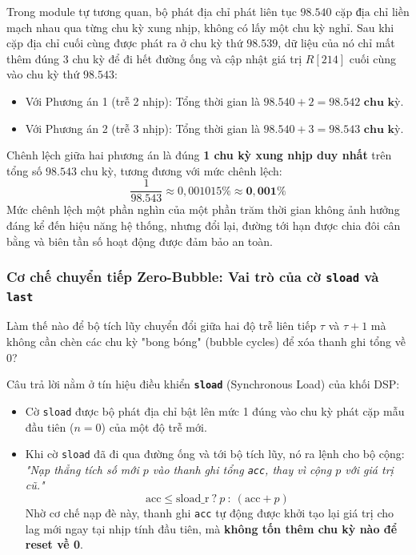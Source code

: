 Trong module tự tương quan, bộ phát địa chỉ phát liên tục $98.540\text{ cặp địa chỉ}$ liền mạch nhau qua từng chu kỳ xung nhịp, không có lấy một chu kỳ nghỉ. Sau khi cặp địa chỉ cuối cùng được phát ra ở chu kỳ thứ $98.539$, dữ liệu của nó chỉ mất thêm đúng 3 chu kỳ để đi hết đường ống và cập nhật giá trị $R[214]$ cuối cùng vào chu kỳ thứ $98.543$:
\begin{itemize}[leftmargin=1.5em, itemsep=2pt]
    \item Với Phương án 1 (trễ 2 nhịp): Tổng thời gian là $98.540 + 2 = \mathbf{98.542\text{ chu kỳ}}$.
    \item Với Phương án 2 (trễ 3 nhịp): Tổng thời gian là $98.540 + 3 = \mathbf{98.543\text{ chu kỳ}}$.
\end{itemize}
Chênh lệch giữa hai phương án là đúng \textbf{1 chu kỳ xung nhịp duy nhất} trên tổng số $98.543\text{ chu kỳ}$, tương đương với mức chênh lệch:
\begin{equation}
\frac{1}{98.543} \approx 0{,}001015\% \approx \mathbf{0{,}001\%}
\end{equation}
Mức chênh lệch một phần nghìn của một phần trăm thời gian không ảnh hưởng đáng kể đến hiệu năng hệ thống, nhưng đổi lại, đường tới hạn được chia đôi cân bằng và biên tần số hoạt động được đảm bảo an toàn.

\subsubsection*{Cơ chế chuyển tiếp Zero-Bubble: Vai trò của cờ \texttt{sload} và \texttt{last}}
Làm thế nào để bộ tích lũy chuyển đổi giữa hai độ trễ liên tiếp $\tau$ và $\tau+1$ mà không cần chèn các chu kỳ "bong bóng" (bubble cycles) để xóa thanh ghi tổng về $0$?

Câu trả lời nằm ở tín hiệu điều khiển \textbf{\texttt{sload}} (Synchronous Load) của khối DSP:
\begin{itemize}[leftmargin=1.5em, itemsep=2pt]
    \item Cờ \texttt{sload} được bộ phát địa chỉ bật lên mức 1 đúng vào chu kỳ phát cặp mẫu đầu tiên ($n = 0$) của một độ trễ mới.
    \item Khi cờ \texttt{sload} đã đi qua đường ống và tới bộ tích lũy, nó ra lệnh cho bộ cộng: \emph{"Nạp thẳng tích số mới $p$ vào thanh ghi tổng \texttt{acc}, thay vì cộng $p$ với giá trị cũ."}
    \begin{equation}
    \text{acc} \le \text{sload\_r} \ ? \ p \ : \ (\text{acc} + p)
    \end{equation}
    Nhờ cơ chế nạp đè này, thanh ghi \texttt{acc} tự động được khởi tạo lại giá trị cho lag mới ngay tại nhịp tính đầu tiên, mà \textbf{không tốn thêm chu kỳ nào để reset về 0}.
\end{itemize}

